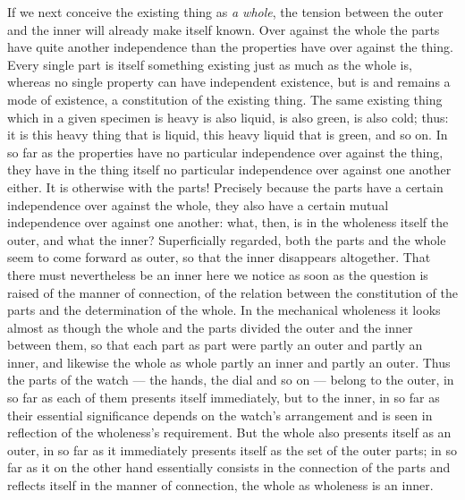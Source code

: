 \documentclass[12pt,a4paper]{book}
\begin{document}
If we next conceive the existing thing as \emph{a whole}, the tension between
the outer and the inner will already make itself known. Over against the whole
the parts have quite another independence than the properties have over against
the thing. Every single part is itself something existing just as much as the
whole is, whereas no single property can have independent existence, but is and
remains a mode of existence, a constitution of the existing thing. The same
existing thing which in a given specimen is heavy is also liquid, is also
green, is also
cold; thus: it is this heavy thing that is liquid, this heavy liquid that is
green, and so on. In so far as the properties have no particular independence
over against the thing, they have in the thing itself no particular
independence over against one another either. It is otherwise with the parts!
Precisely because the parts have a certain independence over against the whole,
they also have a certain mutual independence over against one another: what,
then, is in the wholeness itself the outer, and what the inner? Superficially
regarded, both the parts and the whole seem to come forward as outer, so that
the inner disappears altogether. That there must nevertheless be an inner here
we notice as soon as the question is raised of the manner of connection, of the
relation between the constitution of the parts and the determination of the
whole. In the mechanical wholeness it looks almost as though the whole and the
parts divided the outer and the inner between them, so that each part as part
were partly an outer and partly an inner, and likewise the whole as whole partly
an inner and partly an outer. Thus the parts of the watch --- the hands, the
dial and so on --- belong to the outer, in so far as each of them presents
itself immediately, but to the inner, in so far as their essential significance
depends on the watch's arrangement and is seen in reflection of the wholeness's
requirement. But the whole also presents itself as an outer, in so far as it
immediately presents itself as the set of the outer parts; in so far as it on
the other hand essentially consists in the connection of the parts and reflects
itself in the manner of connection, the whole as wholeness is an inner.
\end{document}
